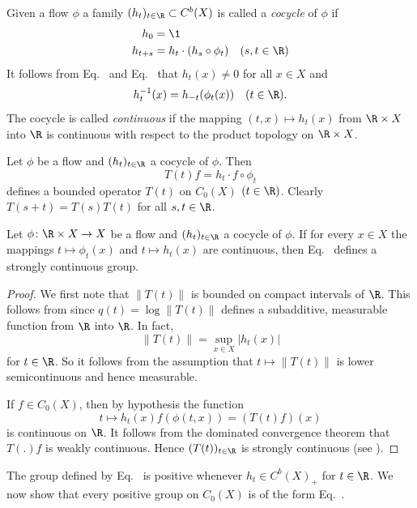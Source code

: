Given a flow $\phi$ a family $(h_{t})_{t \in \R} \subset C^{b}(X)$ is called a \emph{cocycle} of\/ $\phi$ if
\begin{align}
h_{0} &= \1 \label{eq:b2-3.10} \\
h_{t+s} &= h_{t} \cdot (h_{s} \circ \phi_{t}) \quad (s,t \in \R) \label{eq:b2-3.11}
\end{align}
It follows from Eq.~ and Eq.~ that $h_{t}(x) \neq 0$ for all $x \in X$ and 
%
\[
	h_{t}^{-1}(x) = h_{-t}(\phi_{t}(x)) \quad (t \in \R).
\]
%
The cocycle is called \emph{continuous} if the mapping $(t,x) \mapsto h_{t}(x)$ from $\R \times X$ into $\R$ is continuous with respect to the product topology on $\R \times X$.

Let $\phi$ be a flow and $(h_{t})_{t \in \R}$ a cocycle of\/ $\phi$.
Then
\begin{equation}\label{eq:b2-3.12}
T(t)f = h_{t} \cdot f \circ \phi_{t}
\end{equation}
defines a bounded operator $T(t)$ on $C_{0}(X)$ $(t \in \R)$.
Clearly $T(s+t) = T(s)T(t)$ for all $s,t \in \R$.
\begin{proposition}\label{prop:b2-3.8}
Let $\phi \colon \R \times X \to X$ be a flow and $(h_{t})_{t \in \R}$ a cocycle of\/ $\phi$.
If for every $x \in X$ the mappings $t \mapsto \phi_{t}(x)$ and $t \mapsto h_{t}(x)$ are continuous, then Eq.~ defines a strongly continuous group.
\end{proposition}
\begin{proof}
We first note that $\|T(t)\|$ is bounded on compact intervals of\/ $\R$.
This follows from \textcite[7.4.1]{hillephillips:1957} since $q(t) = \log\|T(t)\|$ defines a subadditive, measurable function from $\R$ into $\R$.
In fact, 
%
\[
	\|T(t)\| = \sup_{x \in X}|h_{t}(x)|
\]
%
for $t \in \R$.
So it follows from the assumption that $t \mapsto \|T(t)\|$ is lower semicontinuous and hence measurable.

If\/ $f \in C_{0}(X)$, then by hypothesis the function
%
\[
	t \mapsto h_{t}(x) f(\phi(t,x)) = (T(t) f) (x)
\]
%
is continuous on $\R$.
It follows from the dominated convergence theorem that $T(.)f$ is weakly continuous.
Hence $(T(t))_{t \in \R}$ is strongly continuous (see \eg \textcite[Proposition  1.23]{davies:1980}).
\end{proof}
The group defined by Eq.~ is positive whenever %
$ h_{t} \in  C^{b}(X)_{+}$ for $ t \in \R$.
We now show that every positive group on $C_0(X)$ is of the form Eq.~.
